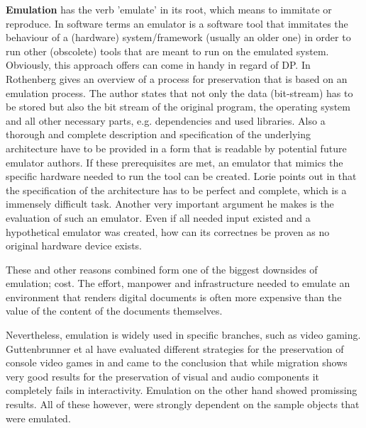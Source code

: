 \textbf{Emulation} has the verb 'emulate' in its root, which means to immitate or reproduce.
In software terms an emulator is a software tool that immitates the behaviour of a (hardware) system/framework (usually an older one) in order to run other (obscolete) tools that are meant to run on the emulated system. Obviously, this approach offers can come in handy in regard of DP.
In \cite{rothenberg:1999:ensuring} Rothenberg gives an overview of a process for preservation that is based on an emulation process. The author states that not only the data (bit-stream) has to be stored but also the bit stream of the original program, the operating system and all other necessary parts, e.g. dependencies and used libraries. Also a thorough and complete description and specification of the underlying architecture have to be provided in a form that is readable by potential future emulator authors. If these prerequisites are met, an emulator that mimics the specific hardware needed to run the tool can be created.
Lorie points out in \cite{Lorie:2001:LTP:379437.379726} that the specification of the architecture has to be perfect and complete, which is a immensely difficult task. Another very important argument he makes is the evaluation of such an emulator. Even if all needed input existed and a hypothetical emulator was created, how can its correctnes be proven as no original hardware device exists.

These and other reasons combined form one of the biggest downsides of emulation; cost. The effort, manpower and infrastructure needed to emulate an environment that renders digital documents is often more expensive than the value of the content of the documents themselves.

Nevertheless, emulation is widely used in specific branches, such as video gaming.
Guttenbrunner et al have evaluated different strategies for the preservation of console video games in \cite{guttenbrunner:2008:evaluating} and came to the conclusion that while migration shows very good results for the preservation of visual and audio components it completely fails in interactivity. Emulation on the other hand showed promissing results. All of these however, were strongly dependent on the sample objects that were emulated.

